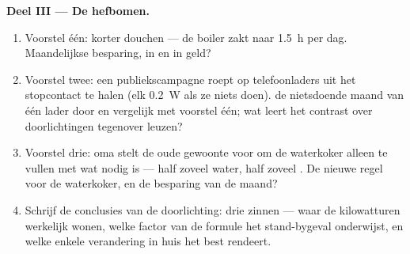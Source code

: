 \begin{problem}
\medskip\noindent\textbf{Deel III --- De hefbomen.}
\begin{enumerate}[resume]
  \item Voorstel één: korter douchen --- de boiler zakt naar
        \qty{1.5}{h} per dag. Maandelijkse besparing, in
         en in geld?
  \item Voorstel twee: een publiekscampagne roept op telefoonladers
        uit het stopcontact te halen (elk \qty{0.2}{W} als ze niets
        doen).  de nietsdoende maand van één lader door en
        vergelijk met voorstel één; wat leert het contrast over
        doorlichtingen tegenover leuzen?
  \item Voorstel drie: oma stelt de oude gewoonte voor om de
        waterkoker alleen te vullen met wat nodig is --- half zoveel
        water, half zoveel . De nieuwe regel voor de
        waterkoker, en de besparing van de maand?
  \item Schrijf de conclusies van de doorlichting: drie zinnen ---
        waar de kilowatturen werkelijk wonen, welke factor van de
        formule het stand-bygeval onderwijst, en welke enkele
        verandering in huis het best rendeert.
\end{enumerate}
\end{problem}
